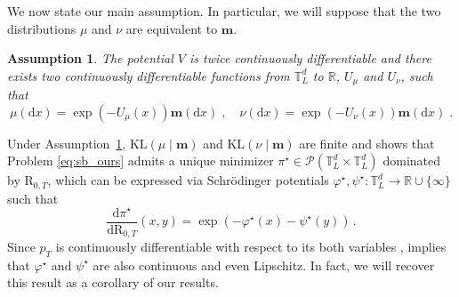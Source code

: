 \documentclass[final,12pt]{colt2023} %
\def\rset{\mathbb{R}}
\newcommand{\cP}{\mathcal{P}}
\newcommand{\De}{\mathrm{d}}
\newcommand{\rmR}{\mathrm{R}}
\newtheorem{assumption}[theorem]{Assumption}
\newcommand{\mm}{\mathbf{m}}
\def\torus{\tset}
\def\torusL{\torus_L}
\def\rset{\mathbb{R}}
\def\tset{\mathbb{T}}
\def\eqsp{\;}
\def\bfm{\mathbf{m}}
\def\varphistar{\varphi^\star}
\def\psistar{\psi^{\star}}
\def\pistar{\pi^{\star}}
\begin{document}
We now state our main assumption. In particular, we will suppose that the two distributions $\mu$ and $\nu$ are equivalent to  $\bfm$.

\begin{assumption}
  \label{ass:density_mu_nu}
The potential  $V$ is twice continuously differentiable and there exists two continuously differentiable functions from $\torusL^d$ to $\rset$, $U_{\mu}$ and $U_{\nu}$, such that 
\begin{equation}\label{eq:log:densities}
\mu(\De x) = \exp(-U_{\mu}(x))\mm(\De x) \eqsp, \quad \nu(\De x) = \exp(-U_{\nu}(x))\mm(\De x) \eqsp.
\end{equation}
\end{assumption}

Under Assumption~\ref{ass:density_mu_nu}, $\mathrm{KL}(\mu\mid\mm)$ and $\mathrm{KL}(\nu \mid\mm)$ are finite and  \cite[Theorem 2.6]{LeoSch} shows that Problem \eqref{eq:sb_ours} admits a unique minimizer $\pistar\in \cP(\mathbb{T}_L^d \times \mathbb{T}_L^d)$ dominated by $\rmR_{0,T}$, which can be expressed via Schr\"odinger potentials $\varphistar, \psistar: \torusL^d \to \rset \cup \{\infty\}$ such that
\begin{equation}\label{plan:potentials}
  \frac{\De \pistar}{\De \rmR_{0,T}} (x,y)=\exp(-\varphistar(x)-\psistar(y))\,.
\end{equation}
Since $p_T$ is continuously differentiable with respect to its both variables \citep{kent1978time}, \citep[Lemma 4.11]{nutz2021introduction} implies that $\varphistar$ and $\psistar$ are also continuous and even Lipschitz. In fact, we will recover this result as a corollary of our results. 
\end{document}
